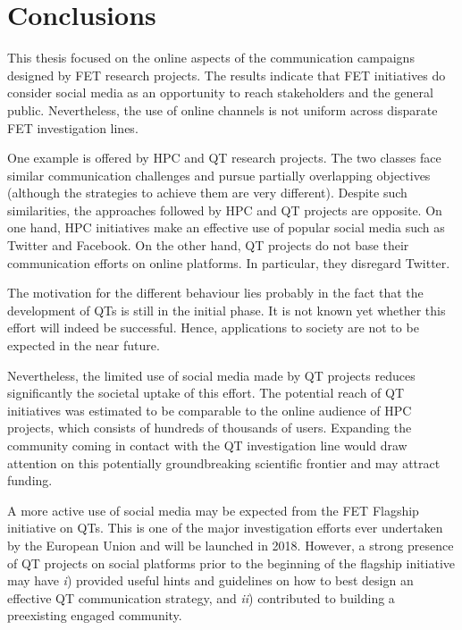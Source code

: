 \chapter*{Conclusions}
This thesis focused on the online aspects of the communication campaigns designed by FET research projects. The results indicate that FET initiatives do consider social media as an opportunity to reach stakeholders and the general public. Nevertheless, the use of online channels is not uniform across disparate FET investigation lines.  

One example is offered by HPC and QT research projects. The two classes face similar communication challenges and pursue partially overlapping objectives (although the strategies to achieve them are very different). Despite such similarities, the approaches followed by HPC and QT projects are opposite. On one hand, HPC initiatives make an effective use of popular social media such as Twitter and Facebook. On the other hand, QT projects do not base their communication efforts on online platforms. In particular, they disregard Twitter.  

The motivation for the different behaviour lies probably in the fact that the development of QTs is still in the initial phase. It is not known yet whether this effort will indeed be successful. Hence, applications to society are not to be expected in the near future. 

Nevertheless, the limited use of social media made by QT projects reduces significantly the societal uptake of this effort. The potential reach of QT initiatives was estimated to be comparable to the online audience of HPC projects, which consists of hundreds of thousands of users. Expanding the community coming in contact with the QT investigation line would draw attention on this potentially groundbreaking scientific frontier and may attract funding.

A more active use of social media may be expected from the FET Flagship initiative on QTs. This is one of the major investigation efforts ever undertaken by the European Union and will be launched in 2018. However, a strong presence of QT projects on social platforms prior to the beginning of the flagship initiative may have \textit{i}) provided useful hints and guidelines on how to best design an effective QT communication strategy, and \textit{ii}) contributed to building a preexisting engaged community.